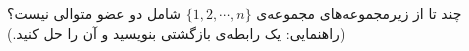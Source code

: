 \EXERCISE
چند تا از زیرمجموعه‌های مجموعه‌ی
$\{1, 2, \cdots, n\}$
شامل دو عضو متوالی نیست؟ (راهنمایی: یک رابطه‌ی بازگشتی بنویسید و آن را حل کنید.)